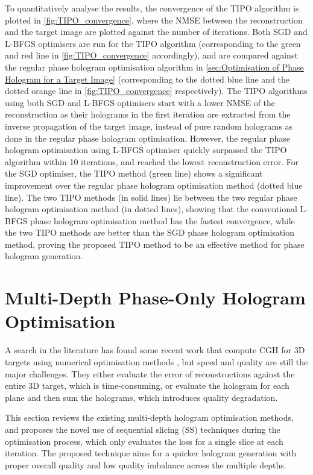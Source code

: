 To quantitatively analyse the results, the convergence of the TIPO algorithm is plotted in \cref{fig:TIPO_convergence}, where the NMSE between the reconstruction and the target image are plotted against the number of iterations. Both SGD and L-BFGS optimisers are run for the TIPO algorithm (corresponding to the green and red line in \cref{fig:TIPO_convergence} accordingly), and are compared against the regular phase hologram optimisation algorithm in \cref{sec:Optimisation of Phase Hologram for a Target Image} (corresponding to the dotted blue line and the dotted orange line in \cref{fig:TIPO_convergence} respectively). The TIPO algorithms using both SGD and L-BFGS optimisers start with a lower NMSE of the reconstruction as their holograms in the first iteration are extracted from the inverse propagation of the target image, instead of pure random holograms as done in the regular phase hologram optimisation. However, the regular phase hologram optimisation using L-BFGS optimiser quickly surpassed the TIPO algorithm within 10 iterations, and reached the lowest reconstruction error. For the SGD optimiser, the TIPO method (green line) shows a significant improvement over the regular phase hologram optimisation method (dotted blue line). The two TIPO methods (in solid lines) lie between the two regular phase hologram optimisation method (in dotted lines), showing that the conventional L-BFGS phase hologram optimisation method has the fastest convergence, while the two TIPO methods are better than the SGD phase hologram optimisation method, proving the proposed TIPO method to be an effective method for phase hologram generation.




\section{Multi-Depth Phase-Only Hologram Optimisation}\label{sec:Multi-Depth Phase-Only Hologram Optimisation}

A search in the literature has found some recent work that compute CGH for 3D targets using numerical optimisation methods \cite{Zhang2017, Liu2020, Choi2021, Chen2021}, but speed and quality are still the major challenges. They either evaluate the error of reconstructions against the entire 3D target, which is time-consuming, or evaluate the hologram for each plane and then sum the holograms, which introduces quality degradation.

This section reviews the existing multi-depth hologram optimisation methods, and proposes the novel use of sequential slicing (SS) techniques during the optimisation process, which only evaluates the loss for a single slice at each iteration. The proposed technique aims for a quicker hologram generation with proper overall quality and low quality imbalance across the multiple depths.


